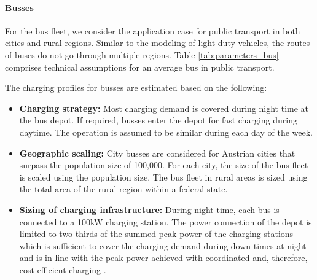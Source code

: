 \documentclass[final,10pt]{elsarticle}
\begin{document}
        \paragraph*{Busses}
        For the bus fleet, we consider the application case for public transport in both cities and rural regions. Similar to the modeling of light-duty vehicles, the routes of buses do not go through multiple regions. Table \ref{tab:parameters_bus} comprises technical assumptions for an average bus in public transport.

            The charging profiles for busses are estimated based on the following:
            \begin{itemize}
                \item \textbf{Charging strategy:} Most charging demand is covered during night time at the bus depot. If required, busses enter the depot for fast charging during daytime. The operation is assumed to be similar during each day of the week.
                \item \textbf{Geographic scaling:} City busses are considered for Austrian cities that surpass the population size of 100,000. For each city, the size of the bus fleet is scaled using the population size. The bus fleet in rural areas is sized using the total area of the rural region within a federal state.  
                \item \textbf{Sizing of charging infrastructure:} During night time, each bus is connected to a 100kW charging station. The power connection of the depot is limited to two-thirds of the summed peak power of the charging stations which is sufficient to cover the charging demand during down times at night and is in line with the peak power achieved with coordinated and, therefore, cost-efficient charging \cite{Borlaug2021}. 
            \end{itemize}
\end{document}
